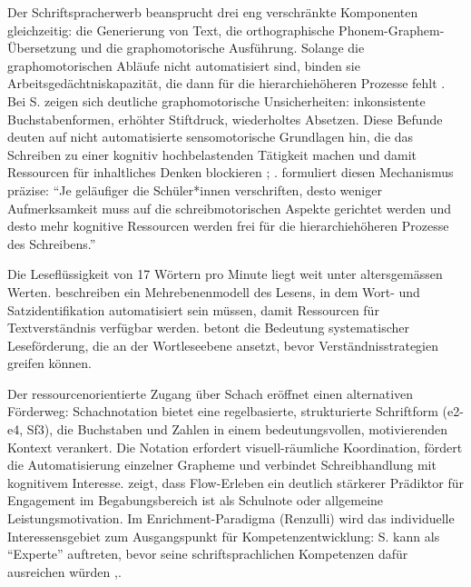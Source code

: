 \documentclass[ngerman, a4paper]{article}
\begin{document}
Der Schriftspracherwerb beansprucht drei eng verschränkte
Komponenten gleichzeitig: die Generierung von Text, die
orthographische Phonem-Graphem-Übersetzung und die graphomotorische
Ausführung. Solange die graphomotorischen Abläufe nicht
automatisiert sind, binden sie Arbeitsgedächtniskapazität, die
dann für die hierarchiehöheren Prozesse fehlt
\parencite[S.\,125,\,130]{nottbusch2017graphomotorik}. Bei S. zeigen sich deutliche
graphomotorische Unsicherheiten: inkonsistente Buchstabenformen, erhöhter Stiftdruck,
wiederholtes Absetzen. Diese Befunde deuten auf nicht automatisierte sensomotorische
Grundlagen hin, die das Schreiben zu einer kognitiv hochbelastenden Tätigkeit machen
und damit Ressourcen für inhaltliches Denken blockieren
\parencite[Kap.\,1--4]{rosebrock2010grundlagen};
\parencite[Kap.\,1--4]{gold2018lesenkannmanlernen}.
\textcite[S.\,3]{hurschler2020handschriftbeurteilung} formuliert diesen
Mechanismus präzise: \enquote{Je geläufiger die Schüler*innen verschriften, desto
weniger Aufmerksamkeit muss auf die schreibmotorischen Aspekte gerichtet werden
und desto mehr kognitive Ressourcen werden frei für die hierarchiehöheren
Prozesse des Schreibens.}
 
Die Leseflüssigkeit von 17 Wörtern pro Minute liegt weit unter altersgemässen Werten.
\textcite[Kap.\,1--4]{rosebrock2010grundlagen} beschreiben ein Mehrebenenmodell des Lesens, in dem Wort- und
Satzidentifikation automatisiert sein müssen, damit Ressourcen für Textverständnis
verfügbar werden. \textcite[Kap.\,1--4]{gold2018lesenkannmanlernen} betont die Bedeutung
systematischer Leseförderung, die an der Wortleseebene ansetzt, bevor
Verständnisstrategien greifen können.
 
Der ressourcenorientierte Zugang über Schach eröffnet einen alternativen Förderweg:
Schachnotation bietet eine regelbasierte, strukturierte Schriftform (e2-e4, Sf3), die
Buchstaben und Zahlen in einem bedeutungsvollen, motivierenden Kontext verankert.
Die Notation erfordert visuell-räumliche Koordination, fördert die Automatisierung
einzelner Grapheme und verbindet Schreibhandlung mit kognitivem Interesse.
\textcite[S.\,84--89]{lehwald2017motivation} zeigt, dass Flow-Erleben ein
deutlich stärkerer Prädiktor für Engagement im Begabungsbereich ist als
Schulnote oder allgemeine Leistungsmotivation. Im Enrichment-Paradigma
(Renzulli) wird das individuelle Interessensgebiet zum Ausgangspunkt für
Kompetenzentwicklung: S. kann als \enquote{Experte} auftreten, bevor seine schriftsprachlichen
Kompetenzen dafür ausreichen würden
\parencite[S.\,444--454]{renzullireis2021rls},\parencite[S.\,254--273]{fischer2020begabungsfoerderung}.
 
\end{document}
